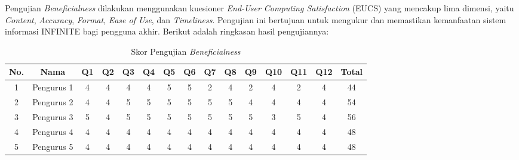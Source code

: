 Pengujian \textit{Beneficialness} dilakukan menggunakan kuesioner \textit{End-User Computing Satisfaction} (EUCS) yang mencakup lima dimensi, yaitu \textit{Content}, \textit{Accuracy}, \textit{Format}, \textit{Ease of Use}, dan \textit{Timeliness}. Pengujian ini bertujuan untuk mengukur dan memastikan kemanfaatan sistem informasi INFINITE bagi pengguna akhir. Berikut adalah ringkasan hasil pengujiannya:
\begin{table}[H]
      \centering
      \caption{Skor Pengujian \textit{Beneficialness}}
      \label{tab:skor-satisfaction}
      \fontsize{8}{10}\selectfont
      \begin{tabular}{|c|c|c|c|c|c|c|c|c|c|c|c|c|c|c|}
            \hline
            \textbf{No.}                          & \textbf{Nama} & \textbf{Q1} & \textbf{Q2} & \textbf{Q3} & \textbf{Q4} & \textbf{Q5} & \textbf{Q6} & \textbf{Q7} & \textbf{Q8} & \textbf{Q9} & \textbf{Q10} & \textbf{Q11} & \textbf{Q12} & \textbf{Total} \\
            \hline
            1                                     & Pengurus 1    & 4           & 4           & 4           & 4           & 5           & 5           & 2           & 4           & 2           & 4            & 2            & 4            & 44             \\
            \hline
            2                                     & Pengurus 2    & 4           & 4           & 5           & 5           & 5           & 5           & 5           & 5           & 4           & 4            & 4            & 4            & 54             \\
            \hline
            3                                     & Pengurus 3    & 5           & 4           & 5           & 5           & 5           & 5           & 5           & 5           & 5           & 3            & 5            & 4            & 56             \\
            \hline
            4                                     & Pengurus 4    & 4           & 4           & 4           & 4           & 4           & 4           & 4           & 4           & 4           & 4            & 4            & 4            & 48             \\
            \hline
            5                                     & Pengurus 5    & 4           & 4           & 4           & 4           & 4           & 4           & 4           & 4           & 4           & 4            & 4            & 4            & 48             \\

\end{tabular}
\end{table}
